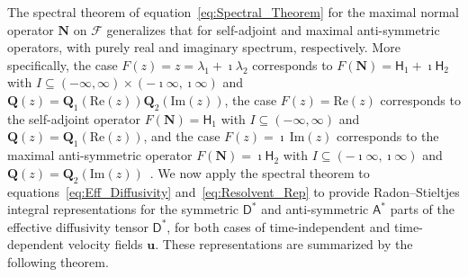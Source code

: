 \documentclass[leqno,onefignum,onetabnum]{siamltex1213}
\newcommand{\Qb}{\mathbf{Q}}
\newcommand{\Nb}{\mathbf{N}}
\newcommand{\Fc}{\mathcal{F}}
\newcommand{\Dm}{\mathsf{D}}
\newcommand{\Hm}{\mathsf{H}}
\newcommand{\Am}{\mathsf{A}}
\newcommand{\vecu}{\boldsymbol{u}}
\begin{document}
 

The spectral theorem of equation~\eqref{eq:Spectral_Theorem} for the
maximal normal operator $\Nb$ on $\Fc$ generalizes that for
self-adjoint and maximal anti-symmetric operators, with purely real
and imaginary spectrum, respectively. More specifically, the case
$F(z)=z=\lambda_1+\imath\lambda_2$ corresponds to $F(\Nb)=\Hm_1+\imath\Hm_2$ with
$I\subseteq(-\infty,\infty)\times(-\imath\infty,\imath\infty)$ and
$\Qb(z)=\Qb_1(\text{Re}(z))\Qb_2(\text{Im}(z))$, the case
$F(z)=\text{Re}(z)$ corresponds to the self-adjoint operator   
$F(\Nb)=\Hm_1$ with $I\subseteq(-\infty,\infty)$ and $\Qb(z)=\Qb_1(\text{Re}(z))$,
and the case $F(z)=\imath\,\text{Im}(z)$ corresponds to the maximal
anti-symmetric operator $F(\Nb)=\imath\Hm_2$ with $I\subseteq(-\imath\infty,\imath\infty)$ and
$\Qb(z)=\Qb_2(\text{Im}(z))$~\cite{Stone:64}. We now apply the
spectral theorem to equations~\eqref{eq:Eff_Diffusivity}
and~\eqref{eq:Resolvent_Rep} to provide Radon--Stieltjes integral 
representations for the symmetric $\Dm^*$ and anti-symmetric
$\Am^*$ parts of the effective diffusivity tensor $\Dm^*$, for
both cases of time-independent and time-dependent velocity fields
$\vecu $. These representations are summarized by the following
theorem.  
%
\end{document}
